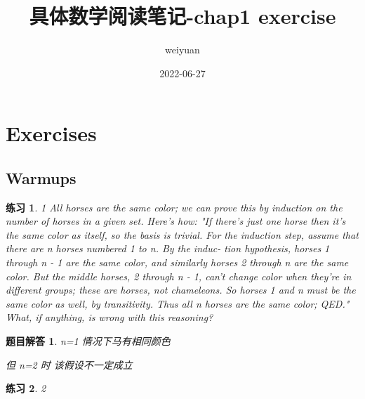 \documentclass[mode=geye, chinesefont=founder]{elegantnote}
\title{具体数学阅读笔记-chap1 exercise}
\author{weiyuan}
\date{2022-06-27}
\newtheorem{exercise}{练习}
\newtheorem{answer}{题目解答}
\begin{document}
\maketitle

\section{Exercises}
\subsection{Warmups}

\begin{exercise}1
	All horses are the same color; we can prove this by induction on the
	number of horses in a given set. Here's how: "If there's just one horse
	then it's the same color as itself, so the basis is trivial. For the induction
	step, assume that there are n horses numbered 1 to n. By the induc-
	tion hypothesis, horses 1 through n - 1 are the same color, and similarly
	horses 2 through n are the same color. But the middle horses, 2 through
	n - 1, can't change color when they're in different groups; these are
	horses, not chameleons. So horses 1 and n must be the same color as
	well, by transitivity. Thus all n horses are the same color; QED." What,
	if anything, is wrong with this reasoning?
\end{exercise}

\begin{answer}
	n=1 情况下马有相同颜色
	
	但 n=2 时	该假设不一定成立
\end{answer}


\begin{exercise}2
\end{exercise}
\end{document}
